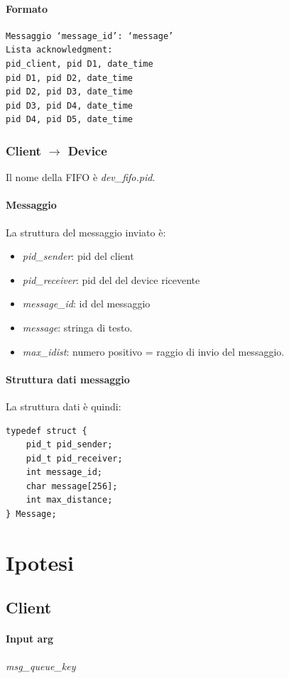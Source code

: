 \documentclass[10pt,a4paper]{article}
\begin{document}
{\paragraph{Formato}
\begin{Verbatim}
Messaggio ‘message_id’: ‘message’
Lista acknowledgment:
pid_client, pid D1, date_time
pid D1, pid D2, date_time
pid D2, pid D3, date_time
pid D3, pid D4, date_time
pid D4, pid D5, date_time
\end{Verbatim}
\subsubsection{Client $\longrightarrow$ Device} \label{ClientDevice}
Il nome della FIFO è \emph{dev\_fifo.pid}.
\paragraph{Messaggio} 
La struttura del messaggio inviato è:
\begin{itemize}
\item \emph{pid\_sender}: pid del client
\item \emph{pid\_receiver}: pid del del device ricevente
\item \emph{message\_id}: id del messaggio
\item \emph{message}: stringa di testo.
\item \emph{max\_idist}: numero positivo = raggio di invio del messaggio. 
\end{itemize}
\paragraph{Struttura dati messaggio}
La struttura dati è quindi:
\begin{Verbatim}
typedef struct {
	pid_t pid_sender;
	pid_t pid_receiver;
	int message_id;
	char message[256];
	int max_distance;
} Message;
\end{Verbatim}

\section{Ipotesi}
\subsection{Client}
\paragraph{Input arg}
\emph{msg\_queue\_key}

}
\end{document}
